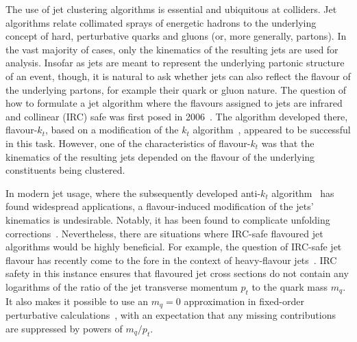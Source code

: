 \documentclass[nofootinbib,twocolumn,preprintnumbers,superscriptaddress,aps]{revtex4-2}
\begin{document}
The use of jet clustering algorithms is essential and ubiquitous at colliders.
%
Jet algorithms relate collimated sprays of energetic hadrons to the
underlying concept of hard, perturbative quarks and gluons (or, more generally, partons).
%
In the vast majority of cases, only the kinematics of the
resulting jets are used for analysis.
%
Insofar as jets are meant to represent the underlying
partonic structure of an event, though, it is natural to ask whether jets can
also reflect the flavour of the underlying partons, for example their
quark or gluon nature.
%
The question of how to formulate a jet algorithm where the flavours assigned to jets
are infrared and collinear (IRC) safe was first posed in
2006~\cite{Banfi:2006hf,Banfi:2007gu}.
%
The algorithm developed there, flavour-$k_t$, based on a modification
of the $k_t$ algorithm~\cite{Catani:1991hj,Catani:1993hr,Ellis:1993tq}, appeared to
be successful in this task.
%
However, one of the characteristics of flavour-$k_t$ was that the kinematics of the
resulting jets depended on the flavour of the underlying constituents
being clustered.

In modern jet usage, where the subsequently developed anti-$k_t$
algorithm~\cite{Cacciari:2008gp} has found widespread applications, a
flavour-induced modification of the jets' kinematics is undesirable.
%
Notably, it has been found to complicate unfolding
corrections~\cite{Gauld:2020deh}.
%
Nevertheless, there are situations where IRC-safe flavoured jet algorithms would be highly beneficial.
%
For example, the question of IRC-safe jet flavour has recently come to the fore in the context of heavy-flavour
jets~\cite{Caletti:2022hnc,Caletti:2022glq,Czakon:2022wam,Gauld:2022lem}.
%
IRC safety in this instance ensures that flavoured jet cross
sections do not contain any logarithms of the ratio of the jet transverse
momentum $p_t$ to the quark mass $m_q$.
%
It also makes it possible to use an $m_q = 0$ approximation in fixed-order perturbative
calculations~\cite{Weinzierl:2006yt,Trocsanyi:2015zma,Ferrera:2017zex,Caola:2017xuq,Gauld:2019yng,Gauld:2020deh,Czakon:2020coa,Hartanto:2022qhh,Hartanto:2022ypo,Czakon:2022khx,Gauld:2023zlv},
with an expectation that any missing contributions are suppressed by
powers of $m_q/p_t$.
\end{document}
